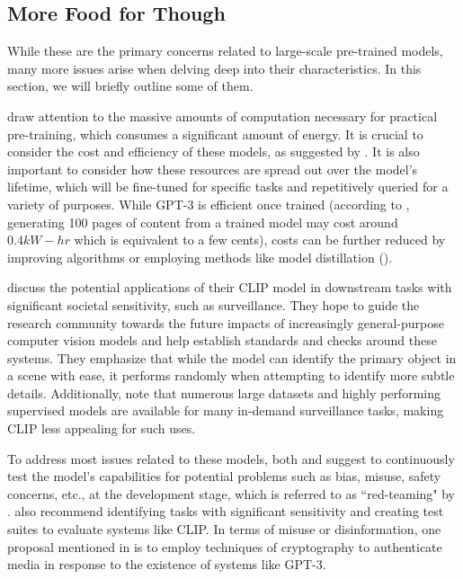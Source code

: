 \documentclass{article}
\begin{document}

\subsection{More Food for Though}
\label{sec:impacts-food}

While these are the primary concerns related to large-scale pre-trained models, many more issues arise when delving deep into their characteristics. In this section, we will briefly outline some of them.

\medskip
\noindent
\citet{brown2020gpt3} draw attention to the massive amounts of computation necessary for practical pre-training, which consumes a significant amount of energy. It is crucial to consider the cost and efficiency of these models, as suggested by \citet{schwartz2020green}. It is also important to consider how these resources are spread out over the model's lifetime, which will be fine-tuned for specific tasks and repetitively queried for a variety of purposes. While GPT-3 is efficient once trained (according to \citet{brown2020gpt3}, generating 100 pages of content from a trained model may cost around $0.4 kW-hr$ which is equivalent to a few cents), costs can be further reduced by improving algorithms or employing methods like model distillation (\citet{liu2019improving}).

\medskip
\noindent
\citet{radford2021clip} discuss the potential applications of their CLIP model in downstream tasks with significant societal sensitivity, such as surveillance. They hope to guide the research community towards the future impacts of increasingly general-purpose computer vision models and help establish standards and checks around these systems. They emphasize that while the model can identify the primary object in a scene with ease, it performs randomly when attempting to identify more subtle details. Additionally, \citet{radford2021clip} note that numerous large datasets and highly performing supervised models are available for many in-demand surveillance tasks, making CLIP less appealing for such uses.

\medskip
\noindent
To address most issues related to these models, both \citet{tamkin2021convention} and \citet{radford2021clip} suggest to continuously test the model's capabilities for potential problems such as bias, misuse, safety concerns, etc., at the development stage, which is referred to as ``red-teaming" by \citet{tamkin2021convention}. \citet{radford2021clip} also recommend identifying tasks with significant sensitivity and creating test suites to evaluate systems like CLIP. In terms of misuse or disinformation, one proposal mentioned in \citet{tamkin2021convention} is to employ techniques of cryptography to authenticate media in response to the existence of systems like GPT-3.
\end{document}
